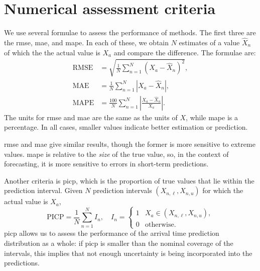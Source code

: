 \chapter{Numerical assessment criteria}
\label{app:error-functions}


We use several formulae to assess the performance of methods. The first three are the \gls{rmse}, \gls{mae}, and \gls{mape}. In each of these, we obtain $N$ estimates of a value $\hat X_n$ of which the the actual value is $X_a$ and compare the difference. The formulae are:
\begin{align}
\label{eq:app_rmse}
\text{RMSE} &= \sqrt{\frac{1}{N}\sum_{n=1}^N \left(X_a - \hat X_n\right)^2}, \\
\label{eq:app_mae}
\text{MAE} &= \frac{1}{N}\sum_{n=1}^N \left|X_a - \hat X_n\right|, \\
\label{eq:app_mape}
\text{MAPE} &= \frac{100}{N}\sum_{n=1}^N \left|\frac{X_a - \hat X_n}{X_a}\right|.
\end{align}
The units for \gls{rmse} and \gls{mae} are the same as the units of $X$, while \gls{mape} is a percentage. In all cases, smaller values indicate better estimation or prediction.


\Gls{rmse} and \gls{mae} give similar results, though the former is more sensitive to extreme values. \gls{mape} is relative to the \emph{size} of the true value, so, in the context of forecasting, it is more sensitive to errors in short-term predictions.

Another criteria is \gls{picp}, which is the proportion of true values that lie within the prediction interval. Given $N$ prediction intervals $(X_{n,\ell}, X_{n,u})$ for which the actual value is $X_a$,
\begin{equation}
\label{eq:picp}
\text{PICP} = \frac{1}{N}\sum_{n=1}^N I_n, \quad
I_n =
\begin{cases}
1 & X_a \in (X_{n,\ell}, X_{n,u}), \\
0 & \text{otherwise.}
\end{cases}
\end{equation}
\Gls{picp} allows us to assess the performance of the arrival time prediction distribution as a whole: if \gls{picp} is smaller than the nominal coverage of the intervals, this implies that not enough uncertainty is being incorporated into the predictions.



